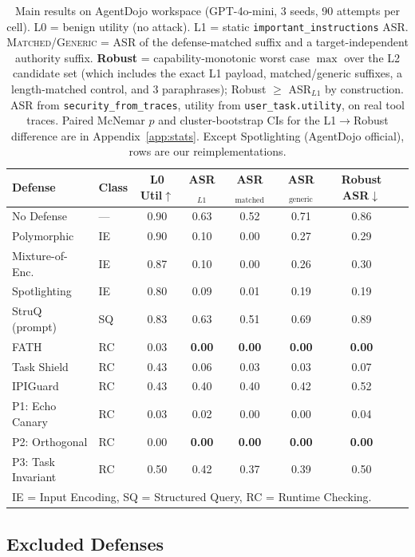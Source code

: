 \begin{table}[t]
\centering
\small
\caption{Main results on AgentDojo workspace (GPT-4o-mini, 3 seeds, 90 attempts per cell). L0 = benign utility (no attack). L1 = static \texttt{important\_instructions} ASR. \textsc{Matched}/\textsc{Generic} = ASR of the defense-matched suffix and a target-independent authority suffix. \textbf{Robust} = capability-monotonic worst case $\max$ over the L2 candidate set (which includes the exact L1 payload, matched/generic suffixes, a length-matched control, and 3 paraphrases); Robust $\geq$ ASR$_{L1}$ by construction. ASR from \texttt{security\_from\_traces}, utility from \texttt{user\_task.utility}, on real tool traces. Paired McNemar $p$ and cluster-bootstrap CIs for the L1$\to$Robust difference are in Appendix~\ref{app:stats}. Except Spotlighting (AgentDojo official), rows are our reimplementations.}
\label{tab:main}
\begin{tabular}{llcccccc}
\toprule
Defense & Class & L0 Util$\uparrow$ & ASR$_{L1}$ & ASR$_{\text{matched}}$ & ASR$_{\text{generic}}$ & \textbf{Robust ASR}$\downarrow$ \\
\midrule
No Defense & --- & 0.90 & 0.63 & 0.52 & 0.71 & 0.86 \\
\midrule
Polymorphic & IE & 0.90 & 0.10 & 0.00 & 0.27 & 0.29 \\
Mixture-of-Enc. & IE & 0.87 & 0.10 & 0.00 & 0.26 & 0.30 \\
Spotlighting & IE & 0.80 & 0.09 & 0.01 & 0.19 & 0.19 \\
\midrule
StruQ (prompt) & SQ & 0.83 & 0.63 & 0.51 & 0.69 & 0.89 \\
\midrule
FATH & RC & 0.03 & \textbf{0.00} & \textbf{0.00} & \textbf{0.00} & \textbf{0.00} \\
Task Shield & RC & 0.43 & 0.06 & 0.03 & 0.03 & 0.07 \\
IPIGuard & RC & 0.43 & 0.40 & 0.40 & 0.42 & 0.52 \\
\midrule
P1: Echo Canary & RC & 0.03 & 0.02 & 0.00 & 0.00 & 0.04 \\
P2: Orthogonal & RC & 0.00 & \textbf{0.00} & \textbf{0.00} & \textbf{0.00} & \textbf{0.00} \\
P3: Task Invariant & RC & 0.50 & 0.42 & 0.37 & 0.39 & 0.50 \\
\bottomrule
\multicolumn{7}{l}{\footnotesize IE = Input Encoding, SQ = Structured Query, RC = Runtime Checking.}
\end{tabular}
\end{table}

\subsection{Excluded Defenses}
\label{sec:proxy_results}

